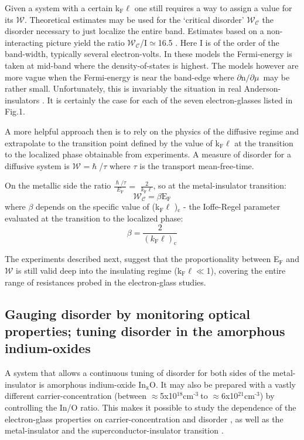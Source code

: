 \documentclass
[preprint,showpacs,byrevtex,10pt,twocolumn,tightenlines,prl,letterpaper]{revtex4}%
\begin{document}
Given a system with a certain k$_{\text{F}}\ell$ one still requires a way to
assign a value for its $\mathcal{W}$. Theoretical estimates may be used for
the `critical disorder' $\mathcal{W}_{\mathcal{C}}$ the disorder necessary to
just localize the entire band. Estimates based on a non-interacting picture
yield the ratio $\mathcal{W}_{\mathcal{C}}$/I$\simeq$16.5 \cite{48}. Here I is
of the order of the band-width, typically several electron-volts. In these
models the Fermi-energy is taken at mid-band where the density-of-states is
highest. The models however are more vague when the Fermi-energy is near the
band-edge where $\partial$n$/\partial\mu$~may be rather small. Unfortunately,
this is invariably the situation in real Anderson-insulators \cite{48}. It is
certainly the case for each of the seven electron-glasses listed in Fig.1.

A more helpful approach then is to rely on the physics of the diffusive regime
and extrapolate to the transition point defined by the value of k$_{\text{F}%
}\ell$ at the transition to the localized phase obtainable from experiments. A
measure of disorder for a diffusive system is $\mathcal{W}$ =$\hslash$/$\tau$
where $\tau$ is the transport mean-free-time.

On the metallic side the ratio $\frac{\hslash/\tau}{E_{\text{F}}}=$ $\frac
{2}{k_{\text{F}}\ell}$, so at the metal-insulator transition:%
\begin{equation}
\mathcal{W}_{\mathcal{C}}=\beta\text{E}_{\text{F}}%
\end{equation}
where $\beta$ depends on the specific value of (k$_{\text{F}}\ell$%
)$_{\text{c}}$ - the Ioffe-Regel parameter evaluated at the transition to the
localized phase:%
\begin{equation}
\beta=\frac{2}{(k_{\text{F}}\ell)_{\text{c}}}%
\end{equation}


The experiments described next, suggest that the proportionality between
E$_{\text{F}}$ and $\mathcal{W}$ is still valid deep into the insulating
regime (k$_{\text{F}}\ell\ll$1), covering the entire range of resistances
probed in the electron-glass studies.

\subsection{Gauging disorder by monitoring optical properties; tuning disorder
in the amorphous indium-oxides}

A system that allows a continuous tuning of disorder for both sides of the
metal-insulator is amorphous indium-oxide In$_{\text{x}}$O. It may also be
prepared with a vastly different carrier-concentration (between $\approx
$5x10$^{\text{18}}$cm$^{\text{-3}}{}{}\ $to $\approx$6x10$^{\text{21}}%
$cm$^{\text{-3}}$) by controlling the In/O ratio. This makes it possible to
study the dependence of the electron-glass properties on carrier-concentration
and disorder \cite{24}, as well as the metal-insulator \cite{24} and the
superconductor-insulator transition \cite{49}.
\end{document}
